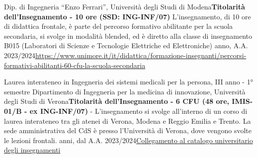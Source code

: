 {
{\newline  Dip. di Ingegneria “Enzo Ferrari'', Università degli Studi di Modena\newline \textbf{Titolarità dell'Insegnamento - 10 ore (SSD: ING-INF/07)}\newline
    L'insegnamento, di 10 ore di didattica frontale, è parte del percorso formativo abilitante per la scuola secondaria, si svolge in modalità blended, ed è diretto alla classe di insegnamento B015 (Laboratori di Scienze e Tecnologie Elettriche ed Elettroniche)}{ anno, A.A. 2023/2024}{\href{https://www.unimore.it/it/didattica/formazione-insegnanti/percorsi-formativi-abilitanti-60-cfu-la-scuola-secondaria}{https://www.unimore.it/it/didattica/formazione-insegnanti/percorsi-formativi-abilitanti-60-cfu-la-scuola-secondaria}}

{Laurea interateneo in Ingegneria dei sistemi medicali per la persona, III anno - 1° semestre}
{\newline  Dipartimento di Ingegneria per la medicina di innovazione, Università degli Studi di Verona}{\newline \textbf{Titolarità dell'Insegnamento - 6 CFU (48 ore, IMIS-01/B - ex ING-INF/07)} -\newline
    L'insegnamento si svolge all'interno di un corso di laurea interateneo tra gli atenei di Verona, Modena e Reggio Emilia e Trento. La sede amministrativa del CdS è presso l'Università di Verona, dove vengono svolte le lezioni frontali. anni, dal A.A. 2023/2024}{\href{https://www.corsi.univr.it/?ent=cs&aa=2024\%2F2025&codiceCs=S25&codins=4S009924&discr=&discrCd=&id=1001&menu=studiare&tab=insegnamenti}{Collegamento al catalogo universitario degli insegnamenti}}

}
